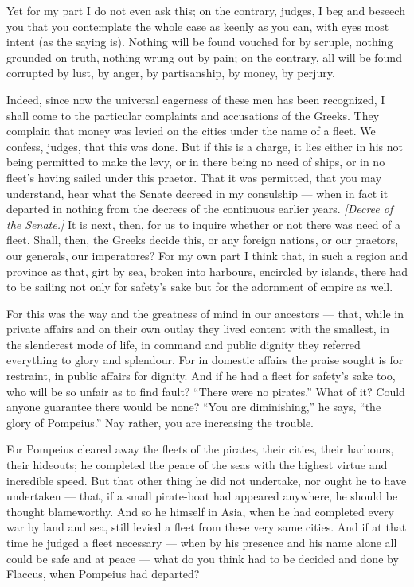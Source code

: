  Yet for my part I do not even ask this; on the contrary, judges, I beg and beseech you that you contemplate the whole case as keenly as you can, with eyes most intent (as the saying is). Nothing will be found vouched for by scruple, nothing grounded on truth, nothing wrung out by pain; on the contrary, all will be found corrupted by lust, by anger, by partisanship, by money, by perjury.

 Indeed, since now the universal eagerness of these men has been recognized, I shall come to the particular complaints and accusations of the Greeks. They complain that money was levied on the cities under the name of a fleet. We confess, judges, that this was done. But if this is a charge, it lies either in his not being permitted to make the levy, or in there being no need of ships, or in no fleet's having sailed under this praetor. That it was permitted, that you may understand, hear what the Senate decreed in my consulship --- when in fact it departed in nothing from the decrees of the continuous earlier years. \textit{[Decree of the Senate.]} It is next, then, for us to inquire whether or not there was need of a fleet. Shall, then, the Greeks decide this, or any foreign nations, or our praetors, our generals, our imperatores? For my own part I think that, in such a region and province as that, girt by sea, broken into harbours, encircled by islands, there had to be sailing not only for safety's sake but for the adornment of empire as well.

 For this was the way and the greatness of mind in our ancestors --- that, while in private affairs and on their own outlay they lived content with the smallest, in the slenderest mode of life, in command and public dignity they referred everything to glory and splendour. For in domestic affairs the praise sought is for restraint, in public affairs for dignity. And if he had a fleet for safety's sake too, who will be so unfair as to find fault? ``There were no pirates.'' What of it? Could anyone guarantee there would be none? ``You are diminishing,'' he says, ``the glory of Pompeius.'' Nay rather, you are increasing the trouble.

 For Pompeius cleared away the fleets of the pirates, their cities, their harbours, their hideouts; he completed the peace of the seas with the highest virtue and incredible speed. But that other thing he did not undertake, nor ought he to have undertaken --- that, if a small pirate-boat had appeared anywhere, he should be thought blameworthy. And so he himself in Asia, when he had completed every war by land and sea, still levied a fleet from these very same cities. And if at that time he judged a fleet necessary --- when by his presence and his name alone all could be safe and at peace --- what do you think had to be decided and done by Flaccus, when Pompeius had departed?

